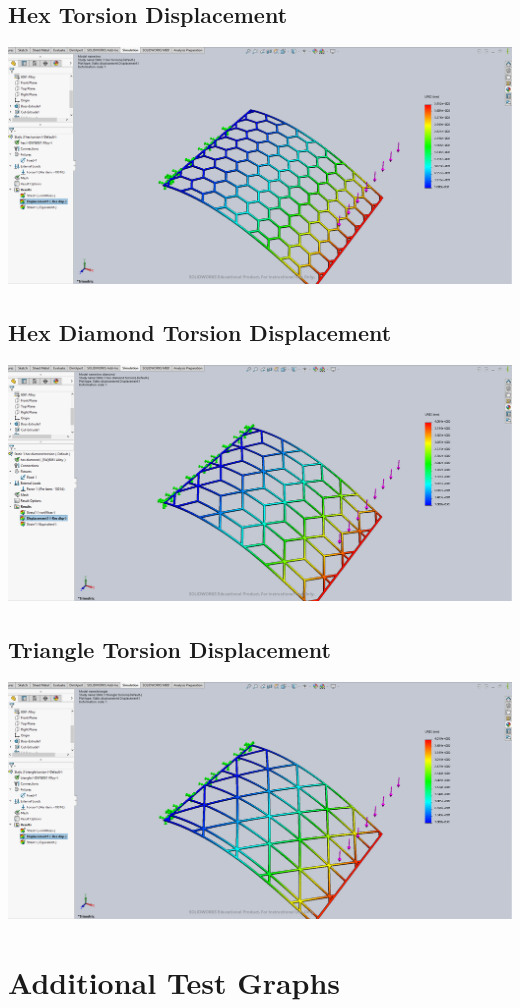 \documentclass[12pt, letterpaper]{article}
\begin{document}
\begin{singlespace}
\subsection{Hex Torsion Displacement}
\label{ap:h-to-d}
\includegraphics[width=0.8\linewidth]{./graphs/torsion/hex-torsion-displacement}

\subsection{Hex Diamond Torsion Displacement}
\label{ap:hd-to-d}
\includegraphics[width=0.8\linewidth]{./graphs/torsion/hex-diamond-torsion-displacement}

\subsection{Triangle Torsion Displacement}
\label{ap:t-to-d}
\includegraphics[width=0.8\linewidth]{./graphs/torsion/triangle-torsion-displacement}

\section{Additional Test Graphs}
\label{ap:graphs}


\end{singlespace}
\end{document}
